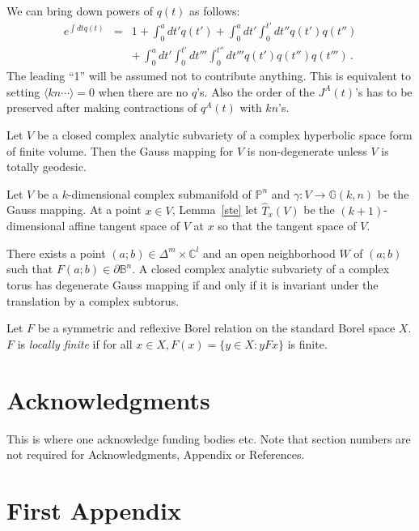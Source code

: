 \documentclass{ws-procs9x6}
\begin{document}
We can bring down powers of $q(t)$ as follows:
\begin{eqnarray} 
e^{\int dt q(t)} &=&1+\int_0^a dt'q(t')
+\int_0^a dt'\int_0^{t'}dt''q(t')q(t'')\nonumber\\[5pt]
&&+\,\int_0^a dt'\int_0^{t'}dt'''\int _0^{t''}dt'''q(t')q(t'')q(t''')\,.
\end{eqnarray}
The leading ``1'' will be assumed not to contribute anything. This is
equivalent to setting $\langle kn\cdots\rangle=0$ when there are
no $q$'s. Also the order of the $J^A(t)$'s has to be preserved after
making contractions of $q^A(t)$ with $kn$'s.

\begin{theorem} \label{theos}
Let $V$ be a closed complex analytic subvariety of a complex
hyperbolic space form of finite volume$.$ Then the Gauss mapping for
$V$ is non-degenerate unless $V$ is totally geodesic$.$
\end{theorem}

Let $V$ be a $k$-dimensional complex submanifold of ${\mathbb P}^n$
and $\gamma: V\rightarrow {\mathbb G}(k,n)$ be the Gauss mapping. At a
point $x\in V$, Lemma~\ref{ste} let $\hat{T}_x(V)$ be the $(k +
1)$-dimensional affine tangent space of $V$ at $x$ so that the tangent
space of $V$.

\begin{lemma}  \label{ste}
There exists a point $(a;b)\in \Delta^m\times {\mathbb C}^l$ and an
open neighborhood $W$ of $(a;b)$ such that $F(a;b)\in \partial 
{\mathbb B}^n$. A closed complex analytic subvariety of 
a complex torus has degenerate Gauss mapping if and only 
if it is invariant under the translation by a complex subtorus.
\end{lemma}

Let $F$ be a symmetric and reflexive Borel relation on the standard
Borel space $X$. $F$ is {\it locally finite} if for all $x\in X,
F(x)=\{y\in X: yFx\}$ is finite.

\section*{Acknowledgments}
This is where one acknowledge funding bodies etc.  Note that section
numbers are not required for Acknowledgments, Appendix or References.

\appendix

\section{First Appendix}
\end{document}
